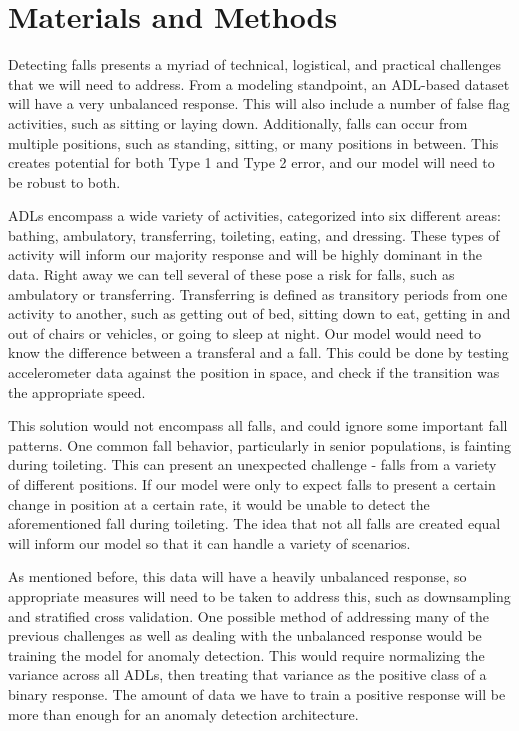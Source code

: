 \documentclass{llncs}
\begin{document}
\section{Materials and Methods}
	Detecting falls presents a myriad of technical, logistical, and practical challenges that we will need to address. From a modeling standpoint, an ADL-based dataset will have a very unbalanced response. This will also include a number of false flag activities, such as sitting or laying down. Additionally, falls can occur from multiple positions, such as standing, sitting, or many positions in between. This creates potential for both Type 1 and Type 2 error, and our model will need to be robust to both.
    
    ADLs encompass a wide variety of activities, categorized into six different areas: bathing, ambulatory, transferring, toileting, eating, and dressing. These types of activity will inform our majority response and will be highly dominant in the data. Right away we can tell several of these pose a risk for falls, such as ambulatory or transferring. Transferring is defined as transitory periods from one activity to another, such as getting out of bed, sitting down to eat, getting in and out of chairs or vehicles, or going to sleep at night. Our model would need to know the difference between a transferal and a fall. This could be done by testing accelerometer data against the position in space, and check if the transition was the appropriate speed. 
    
    This solution would not encompass all falls, and could ignore some important fall patterns. One common fall behavior, particularly in senior populations, is fainting during toileting. This can present an unexpected challenge - falls from a variety of different positions. If our model were only to expect falls to present a certain change in position at a certain rate, it would be unable to detect the aforementioned fall during toileting. The idea that not all falls are created equal will inform our model so that it can handle a variety of scenarios.
    
    As mentioned before, this data will have a heavily unbalanced response, so appropriate measures will need to be taken to address this, such as downsampling and stratified cross validation. One possible method of addressing many of the previous challenges as well as dealing with the unbalanced response would be training the model for anomaly detection. This would require normalizing the variance across all ADLs, then treating that variance as the positive class of a binary response. The amount of data we have to train a positive response will be more than enough for an anomaly detection architecture.
    
\end{document}
